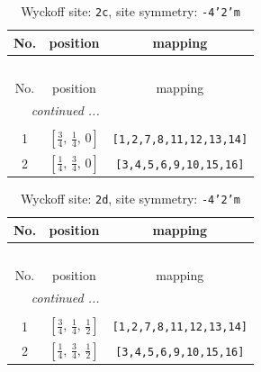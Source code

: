 \documentclass[fleqn,8pt]{jsarticle}
\begin{document}
\renewcommand{\arraystretch}{1.2}
\begin{longtable}{ccc}
\caption{Wyckoff site: {\tt 2c}, site symmetry: {\tt -4'2'm}}
 \\
 \hline \hline
No. & position & mapping \\ \hline \endfirsthead

\multicolumn{2}{l}{\tablename\ \thetable{}} \\
 \hline \hline
No. & position & mapping \\ \hline \endhead

 \hline \hline
\multicolumn{2}{r}{\footnotesize\it continued ...} \\ \endfoot

 \hline \hline
\multicolumn{2}{r}{} \\ \endlastfoot

1 & $\left[ \frac{3}{4},\, \frac{1}{4},\, 0 \right]$ & {\tt [1,2,7,8,11,12,13,14]} \\ \hline
2 & $\left[ \frac{1}{4},\, \frac{3}{4},\, 0 \right]$ & {\tt [3,4,5,6,9,10,15,16]} \\
\end{longtable}
\renewcommand{\arraystretch}{1.2}
\begin{longtable}{ccc}
\caption{Wyckoff site: {\tt 2d}, site symmetry: {\tt -4'2'm}}
 \\
 \hline \hline
No. & position & mapping \\ \hline \endfirsthead

\multicolumn{2}{l}{\tablename\ \thetable{}} \\
 \hline \hline
No. & position & mapping \\ \hline \endhead

 \hline \hline
\multicolumn{2}{r}{\footnotesize\it continued ...} \\ \endfoot

 \hline \hline
\multicolumn{2}{r}{} \\ \endlastfoot

1 & $\left[ \frac{3}{4},\, \frac{1}{4},\, \frac{1}{2} \right]$ & {\tt [1,2,7,8,11,12,13,14]} \\ \hline
2 & $\left[ \frac{1}{4},\, \frac{3}{4},\, \frac{1}{2} \right]$ & {\tt [3,4,5,6,9,10,15,16]} \\
\end{longtable}
\renewcommand{\arraystretch}{1.2}
\end{document}
